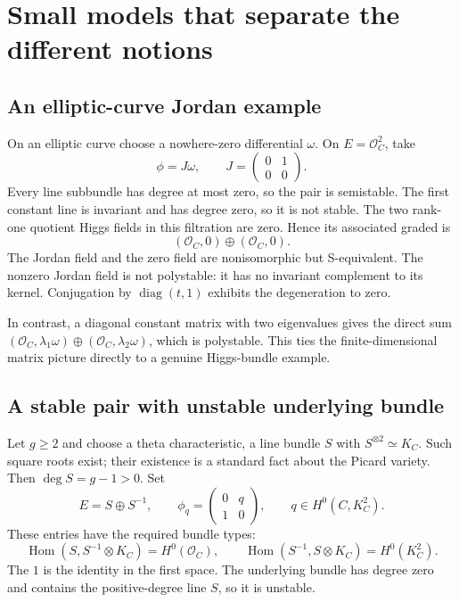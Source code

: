 \documentclass[11pt,a4paper]{article}
\numberwithin{equation}{section}
\theoremstyle{definition}
\newcommand{\OO}{\mathcal O}
\newcommand{\Hom}{\operatorname{Hom}}
\begin{document}
\section{Small models that separate the different notions}
\label{sec:examples}

\subsection{An elliptic-curve Jordan example}
On an elliptic curve choose a nowhere-zero differential $\omega$.
On $E=\OO_C^2$, take
\[
 \phi=J\omega,\qquad J=\begin{pmatrix}0&1\\0&0\end{pmatrix}.
\]
Every line subbundle has degree at most zero, so the pair is semistable.
The first constant line is invariant and has degree zero, so it is not
stable. The two rank-one quotient Higgs fields in this filtration are
zero. Hence its associated graded is
\[
 (\OO_C,0)\oplus(\OO_C,0).
\]
The Jordan field and the zero field are nonisomorphic but S-equivalent.
The nonzero Jordan field is not polystable: it has no invariant
complement to its kernel. Conjugation by $\operatorname{diag}(t,1)$
exhibits the degeneration to zero.

In contrast, a diagonal constant matrix with two eigenvalues gives the
direct sum $(\OO_C,\lambda_1\omega)\oplus(\OO_C,\lambda_2\omega)$,
which is polystable. This ties the finite-dimensional matrix picture
directly to a genuine Higgs-bundle example.

\subsection{A stable pair with unstable underlying bundle}
Let $g\ge2$ and choose a theta characteristic, a line bundle $S$ with
$S^{\otimes2}\simeq K_C$. Such square roots exist; their existence is
a standard fact about the Picard variety. Then $\deg S=g-1>0$.
Set
\begin{equation}\label{eq:theta}
 E=S\oplus S^{-1},\qquad
 \phi_q=\begin{pmatrix}0&q\\1&0\end{pmatrix},\qquad
 q\in H^0(C,K_C^2).
\end{equation}
These entries have the required bundle types:
\[
 \Hom(S,S^{-1}\otimes K_C)=H^0(\OO_C),\qquad
 \Hom(S^{-1},S\otimes K_C)=H^0(K_C^2).
\]
The $1$ is the identity in the first space. The underlying bundle has
degree zero and contains the positive-degree line $S$, so it is unstable.
\end{document}
